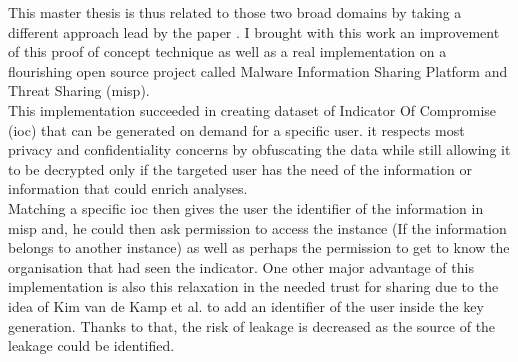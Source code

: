 \documentclass{eplmastersthesis}
\begin{document}
This master thesis is thus related to those two broad domains by taking a different approach lead by the paper \cite{van2016private}. I brought with this work an improvement of this proof of concept technique as well as a real implementation on a flourishing open source project called Malware Information Sharing Platform and Threat Sharing (\gls{misp}).\\
This implementation succeeded in creating dataset of Indicator Of Compromise (\gls{ioc}) that can be generated on demand for a specific user. it respects most privacy and confidentiality concerns by obfuscating the data while still allowing it to be decrypted only if the targeted user has the need of the information or information that could enrich analyses.\\
Matching a specific \gls{ioc} then gives the user the identifier of the information in \gls{misp} and, he could then ask permission to access the instance (If the information belongs to another instance) as well as perhaps the permission to get to know the organisation that had seen the indicator.
One other major advantage of this implementation is also this relaxation in the needed trust for sharing due to the idea of Kim van de Kamp et al. to add an identifier of the user inside the key generation. Thanks to that, the risk of leakage is decreased as the source of the leakage could be identified.\\


\printglossary



\newpage

\backcoverpage
\end{document}
